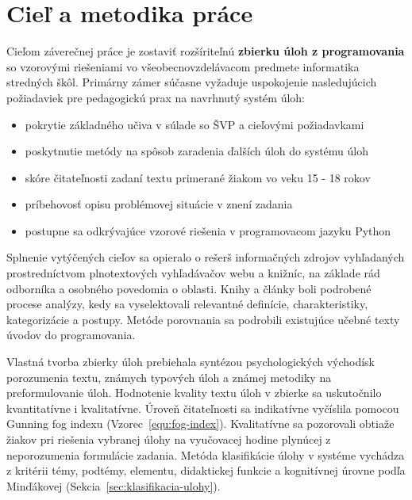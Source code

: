 \chapter{Cieľ a metodika práce}
Cieľom záverečnej práce je zostaviť rozšíriteľnú \textbf{zbierku úloh z programovania} so vzorovými riešeniami vo všeobecnovzdelávacom predmete informatika stredných škôl. Primárny zámer súčasne vyžaduje uspokojenie nasledujúcich požiadaviek pre pedagogickú prax na navrhnutý systém úloh:

\begin{itemize}[noitemsep]
\item pokrytie základného učiva v súlade so ŠVP a cieľovými požiadavkami 
\item poskytnutie metódy na spôsob zaradenia ďalších úloh do systému úloh
\item skóre čitateľnosti zadaní textu primerané žiakom vo veku 15 - 18 rokov
\item príbehovosť opisu problémovej situácie v znení zadania
\item postupne sa odkrývajúce vzorové riešenia v programovacom jazyku Python
\end{itemize}

Splnenie vytýčených cieľov sa opieralo o rešerš informačných zdrojov vyhľadaných prostredníctvom plnotextových vyhľadávačov webu a knižníc, na základe rád odborníka a osobného povedomia o oblasti. Knihy a články boli podrobené procese analýzy, kedy sa vyselektovali relevantné definície, charakteristiky, kategorizácie a postupy. Metóde porovnania sa podrobili existujúce učebné texty úvodov do programovania. 

Vlastná tvorba zbierky úloh prebiehala syntézou psychologických východísk porozumenia textu, známych typových úloh a známej metodiky na preformulovanie úloh. Hodnotenie kvality textu úloh v zbierke sa uskutočnilo kvantitatívne i kvalitatívne. Úroveň čitateľnosti sa indikatívne vyčíslila pomocou Gunning fog indexu (Vzorec~\ref{equ:fog-index}). Kvalitatívne sa pozorovali obtiaže žiakov pri riešenia vybranej úlohy na vyučovacej hodine plynúcej z neporozumenia formulácie zadania. Metóda klasifikácie úlohy v systéme vychádza z kritérii témy, podtémy, elementu, didaktickej funkcie a kognitívnej úrovne podľa Minďákovej (Sekcia~\ref{sec:klasifikacia-ulohy}).
